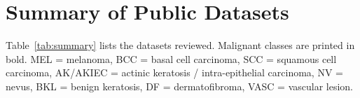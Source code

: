 \documentclass[10pt,a4paper]{article}
\begin{document}

\section{Summary of Public Datasets}
Table~\ref{tab:summary} lists the datasets reviewed. Malignant classes
are printed in bold. MEL = melanoma, BCC = basal cell carcinoma,
SCC = squamous cell carcinoma, AK/AKIEC = actinic keratosis /
intra-epithelial carcinoma, NV = nevus, BKL = benign keratosis,
DF = dermatofibroma, VASC = vascular lesion.
\end{document}
